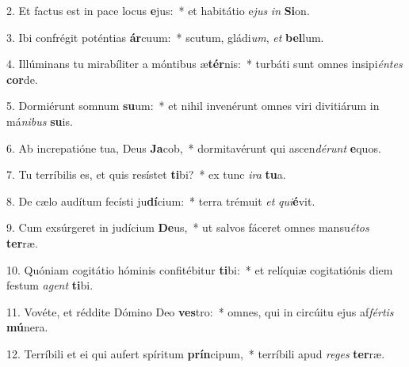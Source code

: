 2. Et factus est in pace locus \textbf{e}jus:~*  et habitátio e\textit{jus} \textit{in} \textbf{Si}on.\

3. Ibi confrégit poténtias \textbf{ár}cuum:~*  scutum, gládi\textit{um}, \textit{et} \textbf{bel}lum.\

4. Illúminans tu mirabíliter a móntibus æ\textbf{tér}nis:~*  turbáti sunt omnes insipi\textit{én}\textit{tes} \textbf{cor}de.\

5. Dormiérunt somnum \textbf{su}um:~*  et nihil invenérunt omnes viri divitiárum in má\textit{ni}\textit{bus} \textbf{su}is.\

6. Ab increpatióne tua, Deus \textbf{Ja}cob,~*  dormitavérunt qui ascen\textit{dé}\textit{runt} \textbf{e}quos.\

7. Tu terríbilis es, et quis resístet \textbf{ti}bi?~*  ex tunc \textit{i}\textit{ra} \textbf{tu}a.\

8. De cælo audítum fecísti ju\textbf{dí}cium:~*  terra trémuit \textit{et} \textit{qui}\textbf{é}vit.\

9. Cum exsúrgeret in judícium \textbf{De}us,~*  ut salvos fáceret omnes mansu\textit{é}\textit{tos} \textbf{ter}ræ.\

10. Quóniam cogitátio hóminis confitébitur \textbf{ti}bi:~*  et relíquiæ cogitatiónis diem festum \textit{a}\textit{gent} \textbf{ti}bi.\

11. Vovéte, et réddite Dómino Deo \textbf{ves}tro:~*  omnes, qui in circúitu ejus af\textit{fér}\textit{tis} \textbf{mú}nera.\

12. Terríbili et ei qui aufert spíritum \textbf{prín}cipum,~*  terríbili apud \textit{re}\textit{ges} \textbf{ter}ræ.\

